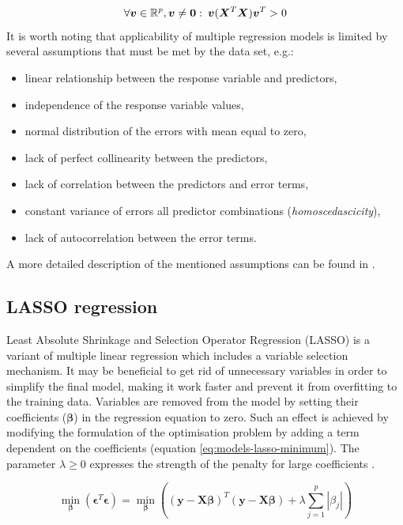 \begin{equation}\label{eq:model-regression-soc}
    \forall {\bm{v} \in \mathbb{R}^{p}, \bm{v} \neq \bm{0}}: \: \bm{v}(\bm{X}^T\bm{X})\bm{v}^T > 0
\end{equation}
It is worth noting that applicability of multiple regression models is limited by several assumptions that must be met by the data set, e.g.: 
\begin{itemize}
    \item linear relationship between the response variable and predictors,
    \item independence of the response variable values,
    \item normal distribution of the errors with mean equal to zero,
    \item lack of perfect collinearity between the predictors,
    \item lack of correlation between the predictors and error terms,
    \item constant variance of errors all predictor combinations     (\textit{homoscedascicity}),
    \item lack of autocorrelation between the error terms.
\end{itemize}
A more detailed description of the mentioned assumptions can be found in \cite{HOFFMAN2008}.

\subsection*{LASSO regression}
Least Absolute Shrinkage and Selection Operator Regression (LASSO) is a variant of multiple linear regression which includes a variable selection mechanism. It may be beneficial to get rid of unnecessary variables in order to simplify the final model, making it work faster and prevent it from overfitting to the training data. Variables are removed from the model by setting their coefficients ($\bm{\beta}$) in the regression equation to zero. Such an effect is achieved by modifying the formulation of the optimisation problem by adding a term dependent on the coefficients (equation \ref{eq:models-lasso-minimum}). The parameter $\lambda \geq 0$ expresses the strength of the penalty for large coefficients \cite{FONTI2017}.

\begin{equation}\label{eq:models-lasso-minimum}
    \min_{\bm{\beta}} (\bm{\epsilon}^T \bm{\epsilon}) = \min_{\bm{\beta}} ((\bm{y} - \bm{X}\bm{\beta})^T (\bm{y} - \bm{X}\bm{\beta}) + \lambda \sum_{j = 1}^{p} |{\beta}_j|)
\end{equation}

